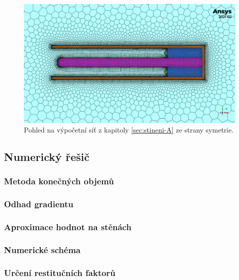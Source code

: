         \begin{figure}
            \centering
            \includegraphics[width=\textwidth]{300_VYPOCETNI_MODEL/mesh_sym_odvetrani_A.png}
            \caption{Pohled na výpočetní síť z kapitoly \ref{sec:stineni-A} ze strany symetrie.}
            \label{fig:sit-detail-stineni-A}
        \end{figure}
        
    \subsection{Numerický řešič}
        \subsubsection{Metoda konečných objemů}
        \subsubsection{Odhad gradientu}
        \subsubsection{Aproximace hodnot na stěnách}
        \subsubsection{Numerické schéma}
        \subsubsection{Určení restitučních faktorů}

        
        